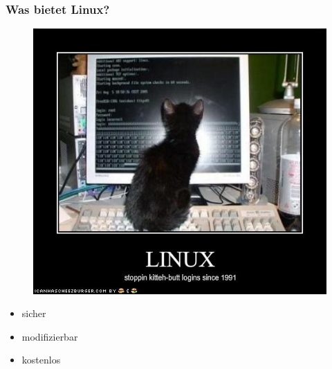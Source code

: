 \begin{frame}
\frametitle{Was bietet Linux?}
\begin{figure}
\includegraphics[scale=0.33]{resources/kitteh.jpg}
\end{figure}
\begin{itemize}
	\item sicher
	\item modifizierbar
	\item kostenlos
\end{itemize}
\end{frame}

